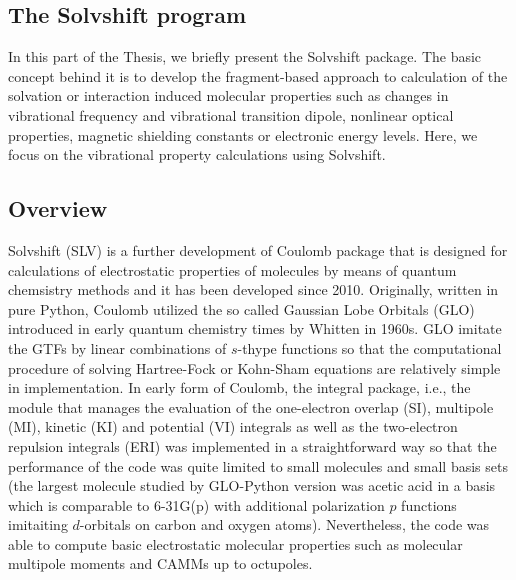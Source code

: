\documentclass[a4paper,titlepage,twoside,fleqn,12pt]{book}
\begin{document}

\begin{refsection}
\chapter{The Solvshift program}

In this part of the Thesis, we briefly present the {\sc Solvshift}
package. The basic concept behind it is to develop the fragment\hyp{}based
approach to calculation of the solvation or interaction induced
molecular properties such as changes in vibrational frequency and vibrational 
transition dipole, nonlinear optical properties, magnetic shielding
constants or electronic energy levels. Here, we focus on the
vibrational property calculations using {\sc Solvshift}.

\section{Overview}

{\sc Solvshift} (SLV) is a further development of {\sc Coulomb} package
that is designed for calculations of electrostatic properties of molecules
by means of quantum chemsistry methods and it has been developed
since 2010. Originally, written in pure Python, {\sc Coulomb} utilized
the so called Gaussian Lobe Orbitals (GLO) introduced in early quantum chemistry
times by Whitten in 1960s. GLO imitate the GTFs by linear combinations
of $s$-thype functions so that the computational procedure of solving
Hartree\hyp{}Fock or Kohn\hyp{}Sham equations are relatively simple
in implementation. In early form of {\sc Coulomb}, the integral package, i.e.,
the module that manages the evaluation of the one\hyp{}electron overlap (SI), multipole (MI),
kinetic (KI) and
potential (VI) integrals as well as the two\hyp{}electron
repulsion integrals (ERI) was implemented in a straightforward way
so that the performance of the code was quite limited to small molecules
and small basis sets (the largest molecule studied by GLO\hyp{}Python version
was acetic acid in a basis which is comparable to 6-31G(p) with additional polarization
$p$ functions imitaiting $d$-orbitals on carbon and oxygen atoms). Nevertheless,
the code was able to compute basic electrostatic molecular properties such as
molecular multipole moments and CAMMs up to octupoles.
 

\end{refsection}
\end{document}
